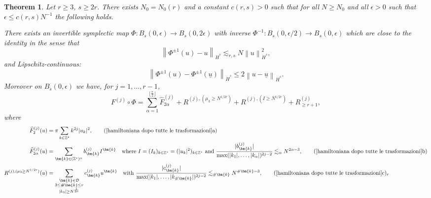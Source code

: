 \documentclass[a4paper,10pt,reqno]{article}
\theoremstyle{definition}
\theoremstyle{plain}
\newtheorem{theorem}[definition]{Theorem}
\theoremstyle{plain}
\theoremstyle{definition}
\theoremstyle{plain}
\theoremstyle{plain}
\theoremstyle{plain}
\theoremstyle{definition}
\theoremstyle{definition}
\newcommand{\norm}[1]{\left\lVert #1 \right\rVert}
\def \Z{\mathbb Z}
\def \k{\bm{k}}
\begin{document}
\begin{theorem} \label{prop: justification normal form}
Let $r \ge 3$, $s \ge 2r$. There exists $N_0=N_0(r)$ and a constant $c(r,s)>0$ such that for all $N\geq N_0$ and all $\epsilon>0$ such that $\epsilon\leq c(r,s) N^{-1}$ the following holds.


There exists an invertible symplectic map $\Phi : B_s(0,\epsilon) \rightarrow B_s(0,2\epsilon)$ with inverse $\Phi^{-1} : B_s(0,\epsilon/2) \rightarrow B_s(0,\epsilon)$
which are close to the identity in the sense that
\begin{equation}
\norm{\Phi^{\pm 1}(u)-u}_{\dot{H}^s} \lesssim_{r,s} N \norm{u}_{\dot{H}^s}^2, 
\label{eq: close to the identity}
\end{equation}
and Lipschitz-continuous:
\begin{equation} \label{eq: lip_const}
\norm{\Phi^{\pm 1}(u)-\Phi^{\pm 1}(\underline{u})}_{\dot{H}^s} \le 2 \norm{u-\underline{u}}_{\dot{H}^s}.
\end{equation}
Moreover on $B_s(0,\epsilon)$ we have, for $j=1,\ldots, r-1$,
\begin{equation}
F^{(j)} \circ \Phi = \sum_{\alpha = 1}^{\lfloor \frac{r}{2} \rfloor } \widehat{F}_{2\alpha}^{(j)} + R^{(j),(\mu_3 \ge N^{1/2r})} + R^{(j),(I \ge N^{1/2r})} + R_{\ge r+1}^{(j)},
\label{hamiltoniana dopo tutte le trasformazioni}
\end{equation}
where
\begin{align}
\widehat{F}_2^{(j)}(u) &= \pi \sum_{k \in \Z^*} k^{2j} |u_k|^2,\tag*{(\ref{hamiltoniana dopo tutte le trasformazioni}a)} \label{parte F2}\\
\widehat{F}_{2\alpha}^{(j)}(u) &= \sum_{\k \in (\Z^*)^{\alpha}} b_{\k}^{(j)} I^{\k} \quad \text{where $I=(I_k)_{k \in \Z^*}=(|u_k|^2)_{k \in \Z^*}$ and $\frac{|b_{\k}^{(j)}|}{\max ( |k_1|,\ldots,|k_{\alpha}| )^{2j-2} } \lesssim_{\alpha} N^{2\alpha-3}$},\tag*{(\ref{hamiltoniana dopo tutte le trasformazioni}b)} \label{parte integrabile 2} \\
R^{(j),(\mu_3 \ge N^{1/2r})}(u) &= \sum_{ \substack{ \k \in \mathcal{D} \\ 3 \le \#\k \le r \\ |k_3| \ge N^{\frac{1}{2r}}} } c_{\k}^{(j)} u^{\k} \quad \text{with $\frac{|c_{\k}^{(j)}|}{\max ( |k_1|,\ldots,|k_{\#\k}| )^{2j-2} } \lesssim_{\#\k} N^{\#\k-3}$}, \tag*{(\ref{hamiltoniana dopo tutte le trasformazioni}c)$_r$} \label{terzo indice grande} \\

\end{align}
\end{theorem}
\end{document}
